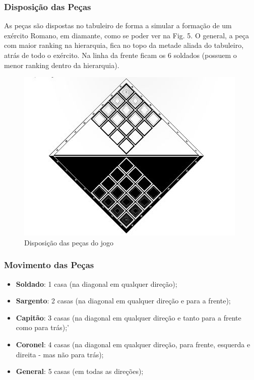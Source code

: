 \subsubsection{Disposição das Peças}
As peças são dispostas no tabuleiro de forma a simular a formação de um exército Romano, em diamante, como se poder ver na Fig. 5.
O general, a peça com maior ranking na hierarquia, fica no topo da metade aliada do tabuleiro, atrás de todo o exército.
Na linha da frente ficam os 6 soldados (possuem o menor ranking dentro da hierarquia).

\begin{figure}[h!]
\begin{center}
\includegraphics[scale=0.5]{img/pieces-disposition.jpg}
\caption{Disposição das peças do jogo}
\label{fig:4}
\end{center}
\end{figure}

\newpage

\subsubsection{Movimento das Peças}

\begin{itemize}
	\item \textbf{Soldado}: 1 casa (na diagonal em qualquer direção);
	\item \textbf{Sargento}: 2 casas (na diagonal em qualquer direção e para a frente);
	\item \textbf{Capitão}: 3 casas (na diagonal em qualquer direção e tanto para a frente como para trás);'
	\item \textbf{Coronel}: 4 casas (na diagonal em qualquer direção, para frente, esquerda e direita - mas não para trás);
	\item \textbf{General}: 5 casas (em todas as direções);
\end{itemize}

